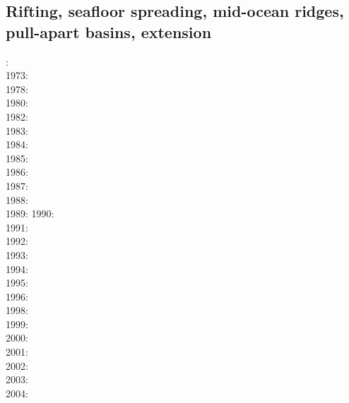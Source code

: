 \subsection{Rifting, seafloor spreading, mid-ocean ridges, pull-apart basins, extension}

{\scriptsize
{}: \cite{lath72}\\
1973: \cite{froi73}\\
1978: \cite{stei78}\cite{mcke78}\\
1980: \cite{bran80}\\
1982: \cite{bekb82}\\
1983: \cite{engl83}\\
1984: \cite{poay84}\\
1985: \cite{bosw85}\\
1986: \cite{hoen86b}\cite{zupf86}\cite{zupa86}\cite{mofr86}\cite{mcke86}\cite{buck86}\\
1987: \cite{spmc87}\\
1988: \cite{bums88}\\
1989: \cite{mewi89}\cite{brbe89}\cite{ismb89}\cite{soen89}\cite{brbe89b}\cite{brbe89c}
1990: \cite{fara90}\cite{lipa90}\cite{mccl90}\cite{chmo90}\cite{chmo90b}\\
1991: \cite{trbr91}\cite{buck91}\\
1992: \cite{zieg92b}\cite{egan92}\\
1993: \cite{gowo93}\\
1994: \cite{trca94}\cite{jhpp94}\\
1995: \cite{gowo95}\cite{katl95}\\
1996: \cite{dusa96}\cite{beda96}\cite{mada96}\\
1998: \cite{rafm98}\\
1999: \cite{brun99}\cite{bulp99}\cite{gowo99}\\
2000: \cite{scth00}\\
2001: \cite{hupc01}\cite{hupc01b}\cite{frbr01}\cite{frnb01a}\cite{frnb01b}\\
2002: \cite{hube02}\cite{hani02}\cite{dabm02}\cite{vacl02}\cite{belz02}\cite{hupc02}
      \cite{hube02b}\cite{vacl02}\cite{labu02}\\
2003: \cite{hube03}\cite{hani03}\cite{covb03}\cite{wibm03}\\
2004: \cite{hier04}\cite{sees04}\\
}
